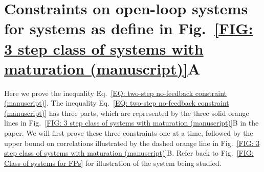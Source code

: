 \documentclass[%
 reprint,prx,
superscriptaddress,
%
%
%
%
%
%
%
%
%
 amsmath,amssymb,
 aps,
%
%
%
%
%
%
]{revtex4-2}
\begin{document}
{
\section{Constraints on open-loop systems for systems as define in Fig.~\ref{FIG: 3 step class of systems with maturation (manuscript)}A } \label{Appendix section on open-loop constraint for fluorescent reporters}

Here we prove the inequality Eq.~\eqref{EQ: two-step no-feedback constraint (manuscript)}. The inequality Eq.~\eqref{EQ: two-step no-feedback constraint (manuscript)} has three parts, which are represented by the three solid orange lines in Fig.~\ref{FIG: 3 step class of systems with maturation (manuscript)}B in the paper. 
We will first prove these three constraints one at a time, followed by the upper bound on correlations illustrated by the dashed orange line in Fig.~\ref{FIG: 3 step class of systems with maturation (manuscript)}B. Refer back to Fig.~\ref{FIG: Class of systems for FPs} for illustration of the system being studied. \\

}
\end{document}
